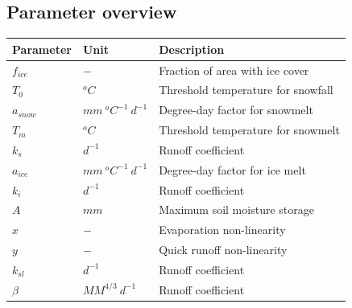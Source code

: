 \subsection{Parameter overview}
\begin{table}[htbp]
  \centering
    \begin{tabular}{lll}
    \toprule
    Parameter & Unit  & Description \\
    \midrule
    $f_{ice}$ & $-$   & Fraction of area with ice cover \\
    $T_0$ & $^oC$ & Threshold temperature for snowfall \\
    $a_{snow}$ & $mm~^oC^{-1}~d^{-1}$ & Degree-day factor for snowmelt \\
    $T_m$ & $^oC$ & Threshold temperature for snowmelt \\
    $k_s$ & $d^{-1}$ & Runoff coefficient \\
    $a_{ice}$ & $mm~^oC^{-1}~d^{-1}$ & Degree-day factor for ice melt \\
    $k_i$ & $d^{-1}$ & Runoff coefficient \\
    $A$   & $mm$  & Maximum soil moisture storage \\
    $x$   & $-$   & Evaporation non-linearity \\
    $y$   & $-$   & Quick runoff non-linearity \\
    $k_{sl}$ & $d^{-1}$ & Runoff coefficient \\
    $\beta$ & $MM^{4/3}~d^{-1}$ & Runoff coefficient \\
    \bottomrule
    \end{tabular}%
  \label{tab:addlabel}%
\end{table}%
